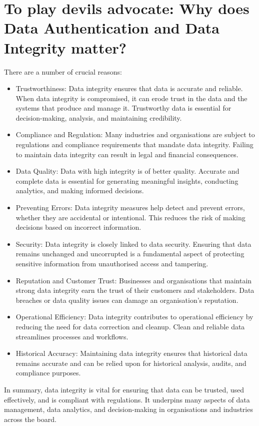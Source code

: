 \documentclass{tufte-handout}
\begin{document}
\section{To play devils advocate: Why does Data Authentication  and Data Integrity matter?}\label{sec:page-layout}
There are a number of crucial reasons:
\begin{itemize}
    \item Trustworthiness: Data integrity ensures that data is accurate and reliable. When data integrity is compromised, it can erode trust in the data and the systems that produce and manage
    it. Trustworthy data is essential for decision-making, analysis, and maintaining credibility.
    \item Compliance and Regulation: Many industries and organisations are subject to regulations and compliance requirements that mandate data integrity. Failing to maintain data integrity can result
    in legal and financial consequences.
    \item Data Quality: Data with high integrity is of better quality. Accurate and complete data is essential for generating meaningful insights, conducting analytics, and making informed decisions.
    \item Preventing Errors: Data integrity measures help detect and prevent errors, whether they are accidental or intentional. This reduces the risk of making decisions based on incorrect information.
    \item Security: Data integrity is closely linked to data security. Ensuring that data remains unchanged and uncorrupted is a fundamental aspect of protecting sensitive information from unauthorised
    access and tampering.
    \item Reputation and Customer Trust: Businesses and organisations that maintain strong data integrity earn the trust of their customers and stakeholders. Data breaches or data quality issues can
    damage an organisation's reputation.
    \item Operational Efficiency: Data integrity contributes to operational efficiency by reducing the need for data correction and cleanup. Clean and reliable data streamlines processes and workflows.
    \item Historical Accuracy: Maintaining data integrity ensures that historical data remains accurate and can be relied upon for historical analysis, audits, and compliance purposes.
\end{itemize}

In summary, data integrity is vital for ensuring that data can be trusted, used effectively, and is compliant with regulations. It underpins many aspects of data management, data analytics,
and decision-making in organisations and industries across the board.
\end{document}
